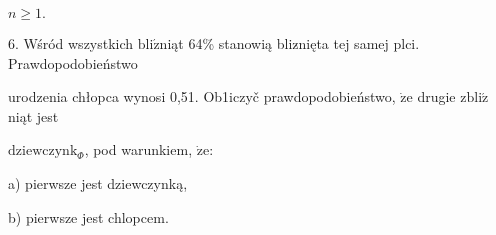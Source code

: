 \documentclass[a4paper,12pt]{article}
\begin{document}
$n\geq 1.$

6. Wśród wszystkich $\mathrm{b}\mathrm{l}\mathrm{i}\acute{\mathrm{z}}$niąt 64\% stanowią bliz$\acute{}$nięta tej samej plci. Prawdopodobieństwo

urodzenia chłopca wynosi 0,51. Ob1iczyč prawdopodobieństwo, $\dot{\mathrm{z}}\mathrm{e}$ drugie $\mathrm{z}\mathrm{b}\mathrm{l}\mathrm{i}\acute{\mathrm{z}}$niąt jest

$\mathrm{d}\mathrm{z}\mathrm{i}\mathrm{e}\mathrm{w}\mathrm{c}\mathrm{z}\mathrm{y}\mathrm{n}\mathrm{k}_{\Phi}$, pod warunkiem, $\dot{\mathrm{z}}\mathrm{e}$:

a) pierwsze jest dziewczynką,

b) pierwsze jest chlopcem.
\end{document}
